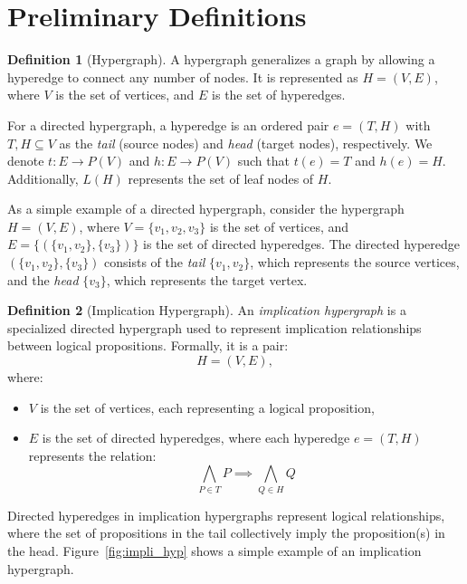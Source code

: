 \documentclass[11pt]{article}
\theoremstyle{definition}
\newtheorem{definition}{Definition}[section]
\theoremstyle{plain}
\theoremstyle{remark}
\begin{document}

\section{Preliminary Definitions}

\begin{definition}[Hypergraph]\label{def:hypergraph}
A hypergraph generalizes a graph by allowing a hyperedge to connect any number of nodes. It is represented as \( H = (V, E) \), where \( V \) is the set of vertices, and \( E \) is the set of hyperedges.

For a directed hypergraph, a hyperedge is an ordered pair \( e = (T, H) \) with \( T, H \subseteq V \) as the \emph{tail} (source nodes) and \emph{head} (target nodes), respectively. We denote \( t:E \to P(V) \) and \( h:E \to P(V) \) such that \( t(e) = T \) and \( h(e) = H \). Additionally, \( L(H) \) represents the set of leaf nodes of \( H \).
\end{definition}



As a simple example of a directed hypergraph, consider the hypergraph \(H = (V, E)\), where \(V = \{v_1, v_2, v_3\}\) is the set of vertices, and \(E = \{(\{v_1, v_2\}, \{v_3\})\}\) is the set of directed hyperedges. The directed hyperedge \((\{v_1, v_2\}, \{v_3\})\) consists of the \emph{tail} \(\{v_1, v_2\}\), which represents the source vertices, and the \emph{head} \(\{v_3\}\), which represents the target vertex.



\begin{definition}[Implication Hypergraph]\label{def:implication_hypergraph}
An \emph{implication hypergraph} is a specialized directed hypergraph used to represent implication relationships between logical propositions. Formally, it is a pair:
\[
H = (V, E),
\]
where:
\begin{itemize}
    \item \(V\) is the set of vertices, each representing a logical proposition,
    \item \(E\) is the set of directed hyperedges, where each hyperedge \(e = (T, H)\) represents the relation:
    \[
    \bigwedge_{P\in T} P \implies \bigwedge_{Q\in H}Q
    \]
\end{itemize}
Directed hyperedges in implication hypergraphs represent logical relationships, where the set of propositions in the tail collectively imply the proposition(s) in the head. Figure~\ref{fig:impli_hyp} shows a simple example of an implication hypergraph. 


\end{definition}
\end{document}
